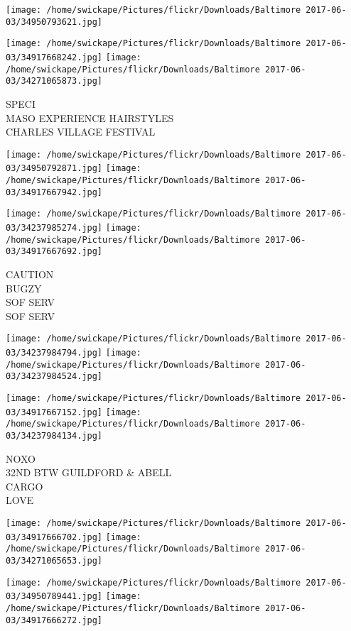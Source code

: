 \documentclass[10pt,letterpaper]{article}
\begin{document}
\texttt{[image: /home/swickape/Pictures/flickr/Downloads/Baltimore 2017-06-03/34950793621.jpg]}

\vspace{0.25in}
\texttt{[image: /home/swickape/Pictures/flickr/Downloads/Baltimore 2017-06-03/34917668242.jpg]}
\texttt{[image: /home/swickape/Pictures/flickr/Downloads/Baltimore 2017-06-03/34271065873.jpg]}

SPECI\\
MASO EXPERIENCE HAIRSTYLES\\
CHARLES VILLAGE FESTIVAL\\
\pagebreak

\texttt{[image: /home/swickape/Pictures/flickr/Downloads/Baltimore 2017-06-03/34950792871.jpg]}
\texttt{[image: /home/swickape/Pictures/flickr/Downloads/Baltimore 2017-06-03/34917667942.jpg]}

\texttt{[image: /home/swickape/Pictures/flickr/Downloads/Baltimore 2017-06-03/34237985274.jpg]}
\texttt{[image: /home/swickape/Pictures/flickr/Downloads/Baltimore 2017-06-03/34917667692.jpg]}

CAUTION\\
BUGZY\\
SOF SERV\\
SOF SERV\\
\pagebreak

\texttt{[image: /home/swickape/Pictures/flickr/Downloads/Baltimore 2017-06-03/34237984794.jpg]}
\texttt{[image: /home/swickape/Pictures/flickr/Downloads/Baltimore 2017-06-03/34237984524.jpg]}

\texttt{[image: /home/swickape/Pictures/flickr/Downloads/Baltimore 2017-06-03/34917667152.jpg]}
\texttt{[image: /home/swickape/Pictures/flickr/Downloads/Baltimore 2017-06-03/34237984134.jpg]}

NOXO\\
32ND BTW GUILDFORD \& ABELL\\
CARGO\\
LOVE\\
\pagebreak

\texttt{[image: /home/swickape/Pictures/flickr/Downloads/Baltimore 2017-06-03/34917666702.jpg]}
\texttt{[image: /home/swickape/Pictures/flickr/Downloads/Baltimore 2017-06-03/34271065653.jpg]}

\texttt{[image: /home/swickape/Pictures/flickr/Downloads/Baltimore 2017-06-03/34950789441.jpg]}
\texttt{[image: /home/swickape/Pictures/flickr/Downloads/Baltimore 2017-06-03/34917666272.jpg]}
\end{document}
